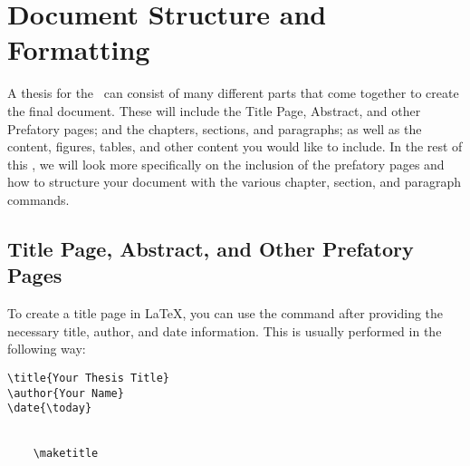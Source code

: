 \chapter{Document Structure and Formatting}\label{ch:documentstructure}
	A thesis for the \University\ can consist of many different parts that come together to create the final document.
	These will include the Title Page, Abstract, and other Prefatory pages; and the chapters, sections, and paragraphs; as well as the content, figures, tables, and other content you would like to include.
	In the rest of this , we will look more specifically on the inclusion of the prefatory pages and how to structure your document with the various chapter, section, and paragraph commands.
	
	\section{Title Page, Abstract, and Other Prefatory Pages}
		To create a title page in \LaTeX, you can use the  command after providing the necessary title, author, and date information. 
		This is usually performed in the following way:

		\begin{lstlisting}[style=LaTeXStyle]
\title{Your Thesis Title}
\author{Your Name}
\date{\today}


	\maketitle

		\end{lstlisting}

